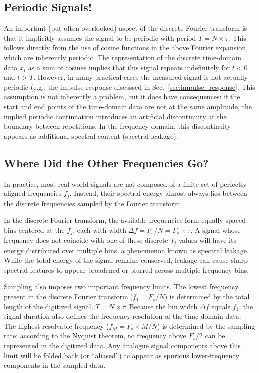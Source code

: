 \documentclass[12pt,a4paper]{article}
\providecommand{\seclabel}[1]{\label{sec:#1}}
\providecommand{\secn}[1]{Sec.~\ref{sec:#1}}
\begin{document}
\subsection{Periodic Signals!}\seclabel{Fourier_periodic}
An important (but often overlooked) aspect of the discrete Fourier transform is that it implicitly assumes the signal to be periodic with period $T = N \times \tau$.  
This follows directly from the use of cosine functions in the above Fourier expansion, which are inherently periodic. The representation of the discrete time-domain data $x_i$ as a sum of cosines implies that this signal repeats indefinitely for $t < 0$ and $t > T$.  
However, in many practical cases the measured signal is not actually periodic (e.g., the impulse response discussed in \secn{impulse_response}. This assumption is not inherently a problem, but it does have consequences: if the start and end points of the time-domain data are not at the same amplitude, the implied periodic continuation introduces an artificial discontinuity at the boundary between repetitions. In the frequency domain, this discontinuity appears as additional spectral content (spectral leakage).

\subsection{Where Did the Other Frequencies Go?}
In practice, most real-world signals are not composed of a finite set of perfectly aligned frequencies $f_j$.  
Instead, their spectral energy almost always lies between the discrete frequencies sampled by the Fourier transform.

In the discrete Fourier transform, the available frequencies form equally spaced bins centered at the $f_j$, each with width $\Delta f = F_s/N = F_s \times \tau$.
A signal whose frequency does not coincide with one of these discrete $f_j$ values will have its energy distributed over multiple bins, a phenomenon known as spectral leakage. While the total energy of the signal remains conserved, leakage can cause sharp spectral features to appear broadened or blurred across multiple frequency bins.

Sampling also imposes two important frequency limits.  
The lowest frequency present in the discrete Fourier transform ($f_1 = F_s/N$) is determined by the total length of the digitized signal, $T = N \times \tau$.  
Because the bin width $\Delta f$ equals $f_1$, the signal duration also defines the frequency resolution of the time-domain data.  
The highest resolvable frequency ($f_M = F_s \times M / N$) is determined by the sampling rate: according to the Nyquist theorem, no frequency above $F_s/2$ can be represented in the digitized data.  
Any analogue signal components above this limit will be folded back (or ``aliased'') to appear as spurious lower-frequency components in the sampled data.
\end{document}
